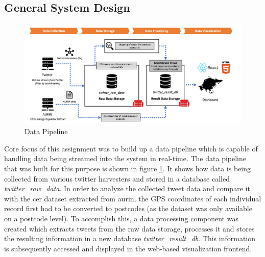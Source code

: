 \documentclass[11pt, oneside]{article}
\begin{document}
\subsection{General System Design}
\begin{figure}
\begin{center}
      \includegraphics[width=0.8\linewidth]{figures/fig_data_pipeline.png}
\end{center}
  \caption{Data Pipeline}
  \label{fig:data_pipeline}
\end{figure}
Core focus of this assignment was to build up a data pipeline which is capable of handling data being streamed into the system in real-time. The data pipeline that was built for this purpose is shown in figure \ref{fig:data_pipeline}. It shows how data is being collected from various twitter harvesters and stored in a database called \textit{twitter\_raw\_data}. In order to analyze the collected tweet data and compare it with the \acrshort{cer} dataset extracted from \acrshort{aurin}, the GPS coordinates of each individual record first had to be converted to postcodes (as the dataset was only available on a postcode level). 
\newline
To accomplish this, a data processing component was created which extracts tweets from the raw data storage, processes it and stores the resulting information in a new database \textit{twitter\_result\_db}. This information is subsequently accessed and displayed in the web-based visualization frontend.
\end{document}
